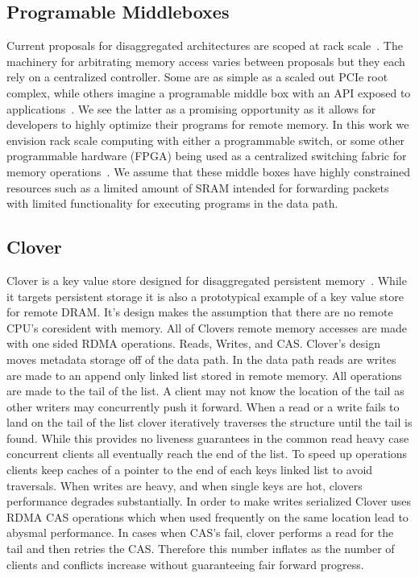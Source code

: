 \subsection{Programable Middleboxes}

Current proposals for disaggregated architectures are scoped at rack
scale~\cite{disandapp,the-machine,intel-rack,firebox}.  The machinery for
arbitrating memory access varies between proposals but they each rely on a
centralized controller.  Some are as simple as a scaled out PCIe root complex,
while others imagine a programable middle box with an API exposed to
applications~\cite{disandapp}. We see the latter as a promising opportunity as
it allows for developers to highly optimize their programs for remote memory.
In this work we envision rack scale computing with either a programmable switch,
or some other programmable hardware (FPGA) being used as a centralized switching
fabric for memory operations~\cite{supernic}. We assume that these middle boxes
have highly constrained resources such as a limited amount of SRAM intended for
forwarding packets with limited functionality for executing programs in the data
path.

\subsection{Clover}

Clover is a key value store designed for disaggregated persistent
memory~\cite{clover}. While it targets persistent storage it is also a
prototypical example of a key value store for remote DRAM. It's design makes the
assumption that there are no remote CPU's coresident with memory. All of Clovers
remote memory accesses are made with one sided RDMA operations. Reads, Writes,
and CAS. Clover's design moves metadata storage off of the data path. In the
data path reads are writes are made to an append only linked list stored in
remote memory. All operations are made to the tail of the list. A client may not
know the location of the tail as other writers may concurrently push it forward.
When a read or a write fails to land on the tail of the list clover iteratively
traverses the structure until the tail is found. While this provides no liveness
guarantees in the common read heavy case concurrent clients all eventually reach
the end of the list. To speed up operations clients keep caches of a pointer to
the end of each keys linked list to avoid traversals. When writes are heavy, and
when single keys are hot, clovers performance degrades substantially. In order
to make writes serialized Clover uses RDMA CAS operations which when used
frequently on the same location lead to abysmal performance. In cases when CAS's
fail, clover performs a read for the tail and then retries the CAS. Therefore
this number inflates as the number of clients and conflicts increase without
guaranteeing fair forward progress.
